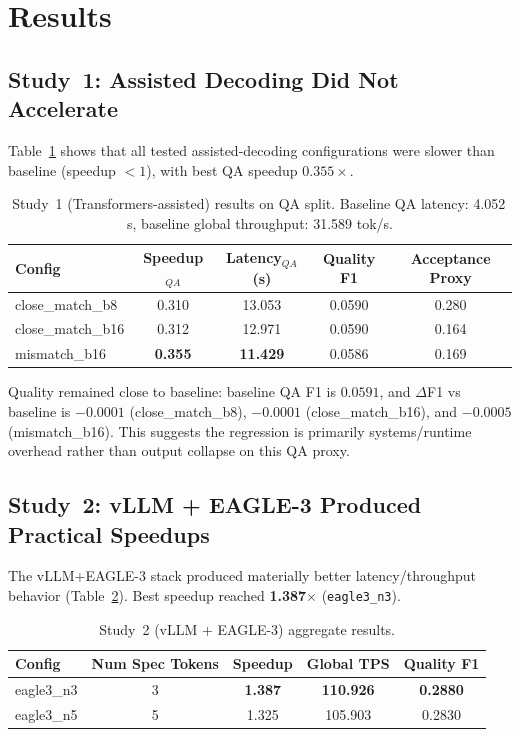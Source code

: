 \documentclass[11pt]{article}
\begin{document}
\section{Results}
\subsection{Study~1: Assisted Decoding Did Not Accelerate}
Table~\ref{tab:phase2} shows that all tested assisted-decoding configurations were slower than baseline (speedup $<1$), with best QA speedup $0.355\times$.

\begin{table}[t]
\centering
\caption{Study~1 (Transformers-assisted) results on QA split. Baseline QA latency: 4.052\,s, baseline global throughput: 31.589 tok/s.}
\label{tab:phase2}
\begin{tabular}{lcccc}
\toprule
Config & Speedup$_{QA}$ & Latency$_{QA}$ (s) & Quality F1 & Acceptance Proxy \\
\midrule
close\_match\_b8  & 0.310 & 13.053 & 0.0590 & 0.280 \\
close\_match\_b16 & 0.312 & 12.971 & 0.0590 & 0.164 \\
mismatch\_b16      & \textbf{0.355} & \textbf{11.429} & 0.0586 & 0.169 \\
\bottomrule
\end{tabular}
\end{table}

Quality remained close to baseline: baseline QA F1 is $0.0591$, and $\Delta$F1 vs baseline is $-0.0001$ (close\_match\_b8), $-0.0001$ (close\_match\_b16), and $-0.0005$ (mismatch\_b16). This suggests the regression is primarily systems/runtime overhead rather than output collapse on this QA proxy.

\subsection{Study~2: vLLM + EAGLE-3 Produced Practical Speedups}
The vLLM+EAGLE-3 stack produced materially better latency/throughput behavior (Table~\ref{tab:phase3-main}). Best speedup reached \textbf{1.387$\times$} (\texttt{eagle3\_n3}).

\begin{table}[t]
\centering
\caption{Study~2 (vLLM + EAGLE-3) aggregate results.}
\label{tab:phase3-main}
\begin{tabular}{lcccc}
\toprule
Config & Num Spec Tokens & Speedup & Global TPS & Quality F1 \\
\midrule
eagle3\_n3 & 3 & \textbf{1.387} & \textbf{110.926} & \textbf{0.2880} \\
eagle3\_n5 & 5 & 1.325 & 105.903 & 0.2830 \\
\bottomrule
\end{tabular}
\end{table}
\end{document}
